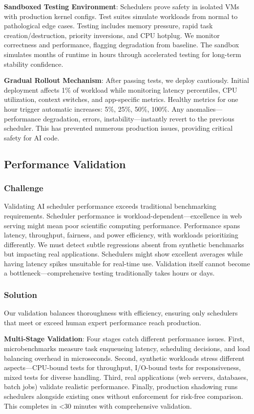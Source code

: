 \textbf{Sandboxed Testing Environment}: Schedulers prove safety in isolated VMs with production kernel configs. Test suites simulate workloads from normal to pathological edge cases. Testing includes memory pressure, rapid task creation/destruction, priority inversions, and CPU hotplug. We monitor correctness and performance, flagging degradation from baseline. The sandbox simulates months of runtime in hours through accelerated testing for long-term stability confidence.

\textbf{Gradual Rollout Mechanism}: After passing tests, we deploy cautiously. Initial deployment affects 1\% of workload while monitoring latency percentiles, CPU utilization, context switches, and app-specific metrics. Healthy metrics for one hour trigger automatic increases: 5\%, 25\%, 50\%, 100\%. Any anomalies—performance degradation, errors, instability—instantly revert to the previous scheduler. This has prevented numerous production issues, providing critical safety for AI code.

\subsection{Performance Validation}

\subsubsection{Challenge}
Validating AI scheduler performance exceeds traditional benchmarking requirements. Scheduler performance is workload-dependent—excellence in web serving might mean poor scientific computing performance. Performance spans latency, throughput, fairness, and power efficiency, with workloads prioritizing differently. We must detect subtle regressions absent from synthetic benchmarks but impacting real applications. Schedulers might show excellent averages while having latency spikes unsuitable for real-time use. Validation itself cannot become a bottleneck—comprehensive testing traditionally takes hours or days.

\subsubsection{Solution}
Our validation balances thoroughness with efficiency, ensuring only schedulers that meet or exceed human expert performance reach production.

\textbf{Multi-Stage Validation}: Four stages catch different performance issues. First, microbenchmarks measure task enqueueing latency, scheduling decisions, and load balancing overhead in microseconds. Second, synthetic workloads stress different aspects—CPU-bound tests for throughput, I/O-bound tests for responsiveness, mixed tests for diverse handling. Third, real applications (web servers, databases, batch jobs) validate realistic performance. Finally, production shadowing runs schedulers alongside existing ones without enforcement for risk-free comparison. This completes in <30 minutes with comprehensive validation.

